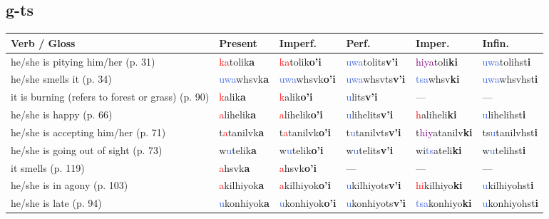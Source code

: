 \documentclass[oneside,openany]{book}%
\begin{document}
\subsection*{g-ts}%
\begin{tabularx}{\textwidth}{>{\hsize=1.5\hsize\RaggedRight}X >{\hsize=0.9\hsize}X >{\hsize=0.9\hsize}X >{\hsize=0.9\hsize}X >{\hsize=0.9\hsize}X >{\hsize=0.9\hsize}X}%
\toprule%
\textbf{Verb / Gloss}&\textbf{Present}&\textbf{Imperf.}&\textbf{Perf.}&\textbf{Imper.}&\textbf{Infin.}\\%
\midrule%
he/she is pitying him/her (p. 31)&\textcolor{Red}{ka}tolik\textbf{a}&\textcolor{Red}{ka}tolik\textbf{o'i}&\textcolor{RoyalBlue}{uwa}tolits\textbf{v'i}&\textcolor{Purple}{hiya}toli\textbf{ki}&\textcolor{RoyalBlue}{uwa}tolihst\textbf{i}\\%
he/she smells it (p. 34)&\textcolor{RoyalBlue}{uwa}whsvk\textbf{a}&\textcolor{RoyalBlue}{uwa}whsvk\textbf{o'i}&\textcolor{RoyalBlue}{uwa}whsvts\textbf{v'i}&\textcolor{RoyalBlue}{tsa}whsv\textbf{ki}&\textcolor{RoyalBlue}{uwa}whsvhst\textbf{i}\\%
it is burning (refers to forest or grass) (p. 90)&\textcolor{Red}{k}alik\textbf{a}&\textcolor{Red}{k}alik\textbf{o'i}&\textcolor{RoyalBlue}{u}lits\textbf{v'i}&---&---\\%
he/she is happy (p. 66)&\textcolor{Red}{a}lihelik\textbf{a}&\textcolor{Red}{a}lihelik\textbf{o'i}&\textcolor{RoyalBlue}{u}lihelits\textbf{v'i}&\textcolor{Red}{h}aliheli\textbf{ki}&\textcolor{RoyalBlue}{u}lihelihst\textbf{i}\\%
he/she is accepting him/her (p. 71)&t\textcolor{Red}{a}tanilvk\textbf{a}&t\textcolor{Red}{a}tanilvk\textbf{o'i}&t\textcolor{RoyalBlue}{u}tanilvts\textbf{v'i}&t\textcolor{Purple}{hiy}atanilv\textbf{ki}&ts\textcolor{RoyalBlue}{u}tanilvhst\textbf{i}\\%
he/she is going out of sight (p. 73)&w\textcolor{RoyalBlue}{u}telik\textbf{a}&w\textcolor{RoyalBlue}{u}telik\textbf{o'i}&w\textcolor{RoyalBlue}{u}telits\textbf{v'i}&wi\textcolor{RoyalBlue}{ts}ateli\textbf{ki}&w\textcolor{RoyalBlue}{u}telihst\textbf{i}\\%
it smells (p. 119)&\textcolor{Red}{a}hsvk\textbf{a}&\textcolor{Red}{a}hsvk\textbf{o'i}&---&---&---\\%
he/she is in agony (p. 103)&\textcolor{Red}{a}kilhiyok\textbf{a}&\textcolor{Red}{a}kilhiyok\textbf{o'i}&\textcolor{RoyalBlue}{u}kilhiyots\textbf{v'i}&\textcolor{Red}{hi}kilhiyo\textbf{ki}&\textcolor{RoyalBlue}{u}kilhiyohst\textbf{i}\\%
he/she is late (p. 94)&\textcolor{RoyalBlue}{u}konhiyok\textbf{a}&\textcolor{RoyalBlue}{u}konhiyok\textbf{o'i}&\textcolor{RoyalBlue}{u}konhiyots\textbf{v'i}&\textcolor{RoyalBlue}{tsa}konhiyo\textbf{ki}&\textcolor{RoyalBlue}{u}konhiyohst\textbf{i}\\%

\end{tabularx}
\end{document}
